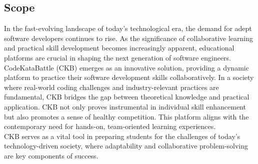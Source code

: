 \subsection{Scope}
In the fast-evolving landscape of today's technological era, the demand for adept software developers continues to rise. As the significance of collaborative learning and practical skill development becomes increasingly apparent, educational platforms are crucial in shaping the next generation of software engineers. \\
CodeKataBattle (CKB) emerges as an innovative solution, providing a dynamic platform to practice their software development skills collaboratively. In a society where real-world coding challenges and industry-relevant practices are fundamental, CKB bridges the gap between theoretical knowledge and practical application. CKB not only proves instrumental in individual skill enhancement but also promotes a sense of healthy competition. This platform aligns with the contemporary need for hands-on, team-oriented learning experiences.
\\ CKB serves as a vital tool in preparing students for the challenges of today's technology-driven society, where adaptability and collaborative problem-solving are key components of success.

